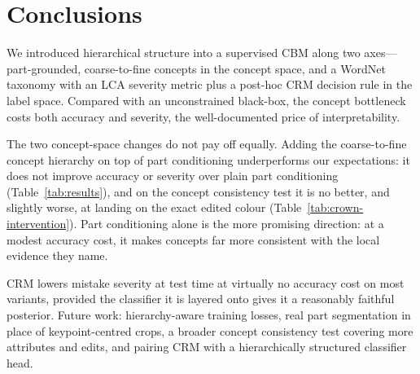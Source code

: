 \section{Conclusions}
We introduced hierarchical structure into a supervised CBM along two
axes---part-grounded, coarse-to-fine concepts in the concept space, and a
WordNet taxonomy with an LCA severity metric plus a post-hoc CRM decision rule
in the label space. Compared with an unconstrained black-box, the concept
bottleneck costs both accuracy and severity, the well-documented price of
interpretability.

The two concept-space changes do not pay off equally. Adding the
coarse-to-fine concept hierarchy on top of part conditioning underperforms
our expectations: it does not improve accuracy or severity over plain part
conditioning (Table~\ref{tab:results}), and on the concept consistency test
it is no better, and slightly worse, at landing on the exact edited colour
(Table~\ref{tab:crown-intervention}). Part conditioning alone is the more
promising direction: at a modest accuracy cost, it makes concepts far more
consistent with the local evidence they name.

CRM lowers mistake severity at test time at virtually no accuracy cost on
most variants, provided the classifier it is layered onto gives it a
reasonably faithful posterior. Future work: hierarchy-aware training losses,
real part segmentation in place of keypoint-centred crops, a broader concept
consistency test covering more attributes and edits, and pairing CRM with a
hierarchically structured classifier head.
